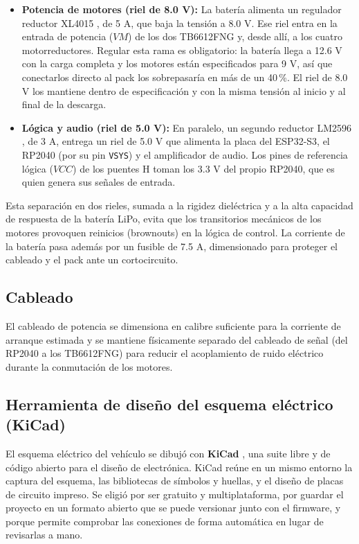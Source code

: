\documentclass[journal]{IEEEtran}
\begin{document}
\begin{itemize}
\item \textbf{Potencia de motores (riel de 8.0 V):} La batería alimenta un regulador reductor XL4015 \cite{xl4015}, de 5 A, que baja la tensión a 8.0 V. Ese riel entra en la entrada de potencia ($VM$) de los dos TB6612FNG y, desde allí, a los cuatro motorreductores. Regular esta rama es obligatorio: la batería llega a 12.6 V con la carga completa y los motores están especificados para 9 V, así que conectarlos directo al pack los sobrepasaría en más de un 40\,\%. El riel de 8.0 V los mantiene dentro de especificación y con la misma tensión al inicio y al final de la descarga.

\item \textbf{Lógica y audio (riel de 5.0 V):} En paralelo, un segundo reductor LM2596 \cite{lm2596}, de 3 A, entrega un riel de 5.0 V que alimenta la placa del ESP32-S3, el RP2040 (por su pin \texttt{VSYS}) y el amplificador de audio. Los pines de referencia lógica ($VCC$) de los puentes H toman los 3.3 V del propio RP2040, que es quien genera sus señales de entrada.
\end{itemize}
Esta separación en dos rieles, sumada a la rigidez dieléctrica y a la alta capacidad de respuesta de la batería LiPo, evita que los transitorios mecánicos de los motores provoquen reinicios (brownouts) en la lógica de control. La corriente de la batería pasa además por un fusible de 7.5 A, dimensionado para proteger el cableado y el pack ante un cortocircuito.
 
\subsection{Cableado}
El cableado de potencia se dimensiona en calibre suficiente para la corriente de arranque estimada y se mantiene físicamente separado del cableado de señal (del RP2040 a los TB6612FNG) para reducir el acoplamiento de ruido eléctrico durante la conmutación de los motores.

\subsection{Herramienta de diseño del esquema eléctrico (KiCad)}
El esquema eléctrico del vehículo se dibujó con \textbf{KiCad} \cite{kicad}, una suite libre y de código abierto para el diseño de electrónica. KiCad reúne en un mismo entorno la captura del esquema, las bibliotecas de símbolos y huellas, y el diseño de placas de circuito impreso. Se eligió por ser gratuito y multiplataforma, por guardar el proyecto en un formato abierto que se puede versionar junto con el firmware, y porque permite comprobar las conexiones de forma automática en lugar de revisarlas a mano.
\end{document}

